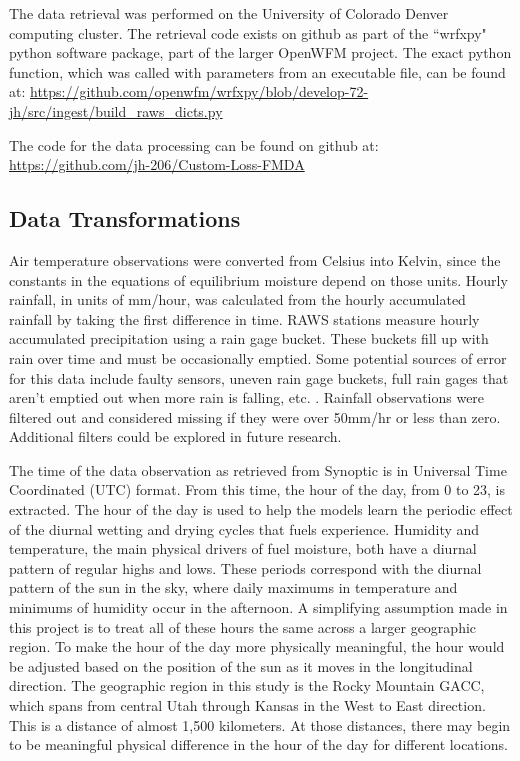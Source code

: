 
The data retrieval was performed on the University of Colorado Denver computing cluster. The retrieval code exists on github as part of the ``wrfxpy" python software package, part of the larger OpenWFM project. The exact python function, which was called with parameters from an executable file, can be found at: \url{https://github.com/openwfm/wrfxpy/blob/develop-72-jh/src/ingest/build_raws_dicts.py}

The code for the data processing can be found on github at: \url{https://github.com/jh-206/Custom-Loss-FMDA}

\subsection{Data Transformations}

Air temperature observations were converted from Celsius into Kelvin, since the constants in the equations of equilibrium moisture depend on those units. Hourly rainfall, in units of mm/hour, was calculated from the hourly accumulated rainfall by taking the first difference in time. RAWS stations measure hourly accumulated precipitation using a rain gage bucket. These buckets fill up with rain over time and must be occasionally emptied. Some potential sources of error for this data include faulty sensors, uneven rain gage buckets, full rain gages that aren't emptied out when more rain is falling, etc. \citep{Campbell-2017-RMM}. Rainfall observations were filtered out and considered missing if they were over 50mm/hr or less than zero. Additional filters could be explored in future research.

The time of the data observation as retrieved from Synoptic is in Universal Time Coordinated (UTC) format. From this time, the hour of the day, from 0 to 23, is extracted. The hour of the day is used to help the models learn the periodic effect of the diurnal wetting and drying cycles that fuels experience. Humidity and temperature, the main physical drivers of fuel moisture, both have a diurnal pattern of regular highs and lows. These periods correspond with the diurnal pattern of the sun in the sky, where daily maximums in temperature and minimums of humidity occur in the afternoon. A simplifying assumption made in this project is to treat all of these hours the same across a larger geographic region. To make the hour of the day more physically meaningful, the hour would be adjusted based on the position of the sun as it moves in the longitudinal direction. The geographic region in this study is the Rocky Mountain GACC, which spans from central Utah through Kansas in the West to East direction. This is a distance of almost 1,500 kilometers. At those distances, there may begin to be meaningful physical difference in the hour of the day for different locations. 

